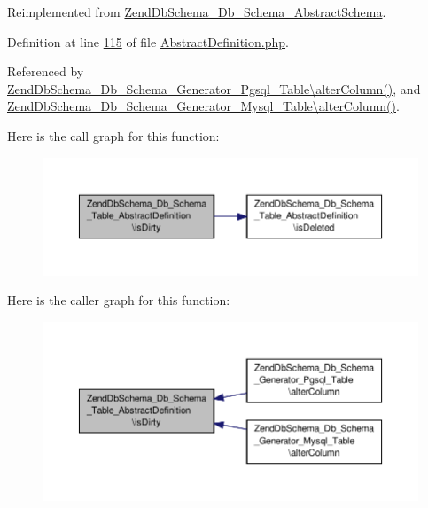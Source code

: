 Reimplemented from \hyperlink{classZendDbSchema__Db__Schema__AbstractSchema_ae859790a91bbcb9c4dc52a6139e5999e}{Zend\-Db\-Schema\-\_\-\-Db\-\_\-\-Schema\-\_\-\-Abstract\-Schema}.



Definition at line \hyperlink{AbstractDefinition_8php_source_l00115}{115} of file \hyperlink{AbstractDefinition_8php_source}{Abstract\-Definition.\-php}.



Referenced by \hyperlink{Generator_2Pgsql_2Table_8php_source_l00174}{Zend\-Db\-Schema\-\_\-\-Db\-\_\-\-Schema\-\_\-\-Generator\-\_\-\-Pgsql\-\_\-\-Table\textbackslash{}alter\-Column()}, and \hyperlink{Generator_2Mysql_2Table_8php_source_l00182}{Zend\-Db\-Schema\-\_\-\-Db\-\_\-\-Schema\-\_\-\-Generator\-\_\-\-Mysql\-\_\-\-Table\textbackslash{}alter\-Column()}.



Here is the call graph for this function\-:\nopagebreak
\begin{figure}[H]
\begin{center}
\leavevmode
\includegraphics[width=350pt]{classZendDbSchema__Db__Schema__Table__AbstractDefinition_a92b77fa23ce49db1c39edcc583ec6cfe_cgraph}
\end{center}
\end{figure}




Here is the caller graph for this function\-:\nopagebreak
\begin{figure}[H]
\begin{center}
\leavevmode
\includegraphics[width=350pt]{classZendDbSchema__Db__Schema__Table__AbstractDefinition_a92b77fa23ce49db1c39edcc583ec6cfe_icgraph}
\end{center}
\end{figure}


